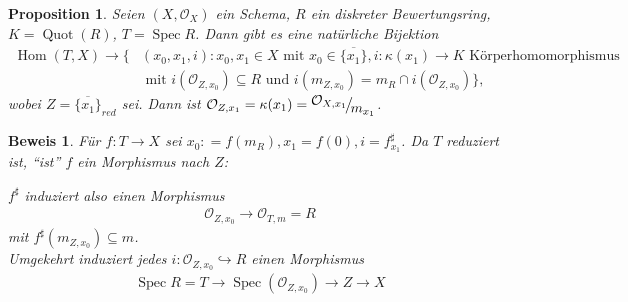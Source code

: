 \documentclass[a4paper,oneside]{scrbook}
\theoremstyle{break}
\newtheorem{Prop}[Def]{Proposition}
\theoremstyle{nonumberbreak}
\theoremstyle{nonumberplain}
\newtheorem{Bew}{Beweis}
\theoremstyle{break}
\newcommand{\defeqr}[0]{\mathrel{\mathop:}=}
\newcommand{\Spec}{%
	\ensuremath{\operatorname{Spec}}%
}
\DeclareMathOperator{\Hom}{Hom}
\DeclareMathOperator{\Quot}{Quot}
\newcommand{\FakRaum}[2]{
  \raisebox{0.7ex}{\ensuremath{#1}}
  \ensuremath{\mkern-3mu}\big/\ensuremath{\mkern-3mu}
  \raisebox{-0.6ex}{\ensuremath{#2}}}
\begin{document}
\begin{Prop}
  \label{prop:7.4}
  Seien $(X,\mathcal O_X)$ ein Schema, $R$ ein diskreter Bewertungsring, $K=\Quot(R)$, $T=\Spec R$. 
  Dann gibt es eine natürliche Bijektion
  \begin{align*}
    \Hom(T,X)\longrightarrow \{ & (x_0,x_1,i):x_0,x_1\in X\text{ mit } x_0\in\overline{\{x_1\}}, i:\kappa(x_1)\to K\text{ Körperhomomorphismus} \\
    & \text{ mit } i(\mathcal O_{Z,x_0})\subseteq R\text{ und } i(m_{Z,x_0})=m_R\cap i(\mathcal O_{Z,x_0})\},
  \end{align*}
  wobei $Z=\overline{\{x_1\}}_{red}$ sei. Dann ist $\mathcal O_{Z,x_1}=\kappa(x_1)=\FakRaum{\mathcal O_{X,x_1}}{m_{x_1}}$.
\end{Prop}

\begin{Bew}
  Für $f:T\to X$ sei $x_0\defeqr f(m_R), x_1=f(0), i=f_{x_1}^\sharp$. Da $T$ reduziert ist, ``ist'' $f$ ein Morphismus nach $Z$:
  \begin{center}
  \end{center}
  $f^\sharp$ induziert also einen Morphismus
  \begin{align*}
    \mathcal O_{Z,x_0}\longrightarrow\mathcal O_{T,m}=R
  \end{align*}
  mit $f^\sharp(m_{Z,x_0})\subseteq m$. \\
  Umgekehrt induziert jedes $i:\mathcal O_{Z,x_0}\hookrightarrow R$ einen Morphismus
  \begin{align*}
    \Spec R=T\to\Spec(\mathcal O_{Z,x_0})\to Z\to X
  \end{align*}
\end{Bew}
\end{document}
